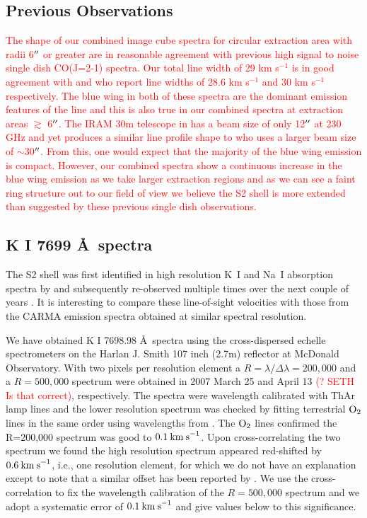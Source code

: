 \documentclass[preprint2]{aastex}
\begin{document}
\subsection{Previous Observations}
\textcolor{red}{
The shape of our combined image cube spectra for circular extraction area with radii 6$\mbox{$^{\prime\prime}$}$ or greater are in reasonable agreement with previous high signal to noise single dish CO(J=2-1) spectra. Our total line width of 29 km s${}^{-1}$ is in good agreement with \cite{1987ApJ...313..400H} and \cite{1994ApJ...424L.127H} who report line widths of 28.6 km s${}^{-1}$ and 30 km s${}^{-1}$ respectively. The blue wing in both of these spectra are the dominant emission features of the line and this is also true in our combined spectra at extraction areas $\gtrsim$ 6$\mbox{$^{\prime\prime}$}$. The IRAM 30m telescope in \cite{1994ApJ...424L.127H} has a beam size of only 12$\mbox{$^{\prime\prime}$}$ at 230 GHz and yet produces a similar line profile shape to \cite{1987ApJ...313..400H} who uses a larger beam size of $\sim$30$\mbox{$^{\prime\prime}$}$. From this, one would expect that the majority of the blue wing emission is compact. However, our combined spectra show a continuous increase in the blue wing emission as we take larger extraction regions and as we can see a faint ring structure out to our field of view we believe the S2 shell is more extended than suggested by these previous single dish observations.}
\subsection{K I 7699 \AA \ spectra}
The S2 shell was first identified in high resolution K~I and Na~I absorption spectra by \cite{1975ApJ...199..427G} and subsequently re-observed multiple times over the next couple of years \citep{1979QJRAS..20..361G}. It is interesting to compare these line-of-sight velocities with those from the CARMA emission spectra obtained at similar spectral resolution.

We have obtained K I 7698.98 \AA \ spectra using the cross-dispersed echelle spectrometers on the Harlan J. Smith 107 inch (2.7m) reflector at McDonald Observatory. With two pixels per resolution element a $R=\lambda/\Delta\lambda=200,000$ and a $R=500,000$ spectrum were obtained in 2007 March 25 and April 13 \textcolor{red}{(? SETH Is that correct)}, respectively. The spectra were wavelength calibrated with ThAr lamp lines and the lower resolution spectrum was checked by fitting terrestrial $\rm{O_2}$ lines in the same order using wavelengths from \cite{1948ApJ...108..167B}.  The $\rm{O_2}$ lines confirmed the R=200,000 spectrum was good to $0.1\>{\rm km\>s}^{-1}$. Upon cross-correlating the two spectrum we found the high resolution spectrum appeared red-shifted by  $0.6\>{\rm km\>s}^{-1}$, i.e., one resolution element, for which we do not have an explanation except to note that a similar offset has been reported by \cite{1994ApJ...436..152W}. We use the cross-correlation to fix the wavelength calibration of the $R=500,000$ spectrum and we adopt a systematic error of $0.1\>{\rm km\>s}^{-1}$ and give values below to this significance.
\end{document}
